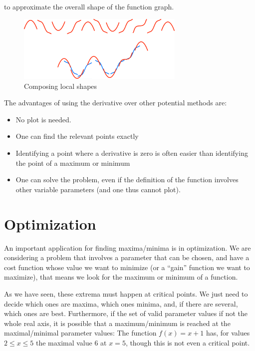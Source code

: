to approximate the overall shape of the function graph.
\begin{figure}
\begin{center}
\includegraphics[width=8cm]{pic/FuncSynth.pdf}
\end{center}
\caption{Composing local shapes}
\label{figfuncsynth}
\end{figure}

\bigskip


The advantages of using the derivative over other potential methods are:
\begin{itemize}
\item No plot is needed.
\item One can find the relevant points exactly
\item Identifying a point where a derivative is zero is often easier than
identifying the point of a maximum or minimum
\item One can solve the problem, even if the definition of the function
involves other variable parameters (and one thus cannot plot).
\end{itemize}

\section{Optimization}

An important application for finding maxima/minima is in optimization. We
are considering a problem that involves a parameter that can be chosen, and
have a cost function whose value we want to minimize (or a ``gain'' function
we want to maximize), that means we look for the maximum or minimum of a
function.
\smallskip

As we have seen, these extrema must happen at critical points. We just need
to decide which ones are maxima, which ones minima, and, if there are
several, which ones are best. Furthermore, if the set of valid parameter
values if not the whole real axis, it is possible that a maximum/minimum is
reached at the maximal/minimal parameter values: The function $f(x)=x+1$ has,
for values $2\le x\le 5$ the maximal value $6$ at $x=5$, though this is not
even a critical point.
\medskip

